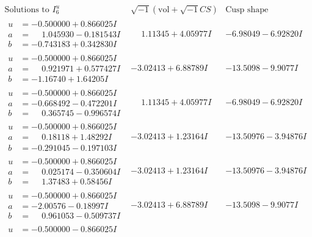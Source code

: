 \documentclass[1p]{elsarticle_modified}
\theoremstyle{definition}
\newcommand{\I}{\sqrt{-1}}
\begin{document}
$$\begin{array}{c|c|c}  
\text{Solutions to }I^u_{6}& \I (\text{vol} + \sqrt{-1}CS) & \text{Cusp shape}\\
 \hline 
\begin{aligned}
u &= -0.500000 + 0.866025 I \\
a &= \phantom{-}1.045930 - 0.181543 I \\
b &= -0.743183 + 0.342830 I\end{aligned}
 & \phantom{-}1.11345 + 4.05977 I & -6.98049 - 6.92820 I \\ \hline\begin{aligned}
u &= -0.500000 + 0.866025 I \\
a &= \phantom{-}0.921971 + 0.577427 I \\
b &= -1.16740 + 1.64205 I\end{aligned}
 & -3.02413 + 6.88789 I & -13.5098 - 9.9077 I \\ \hline\begin{aligned}
u &= -0.500000 + 0.866025 I \\
a &= -0.668492 - 0.472201 I \\
b &= \phantom{-}0.365745 - 0.996574 I\end{aligned}
 & \phantom{-}1.11345 + 4.05977 I & -6.98049 - 6.92820 I \\ \hline\begin{aligned}
u &= -0.500000 + 0.866025 I \\
a &= \phantom{-}0.18118 + 1.48292 I \\
b &= -0.291045 - 0.197103 I\end{aligned}
 & -3.02413 + 1.23164 I & -13.50976 - 3.94876 I \\ \hline\begin{aligned}
u &= -0.500000 + 0.866025 I \\
a &= \phantom{-}0.025174 - 0.350604 I \\
b &= \phantom{-}1.37483 + 0.58456 I\end{aligned}
 & -3.02413 + 1.23164 I & -13.50976 - 3.94876 I \\ \hline\begin{aligned}
u &= -0.500000 + 0.866025 I \\
a &= -2.00576 - 0.18997 I \\
b &= \phantom{-}0.961053 - 0.509737 I\end{aligned}
 & -3.02413 + 6.88789 I & -13.5098 - 9.9077 I \\ \hline\begin{aligned}
u &= -0.500000 - 0.866025 I \\

\end{aligned}
\end{array}$$
\end{document}

